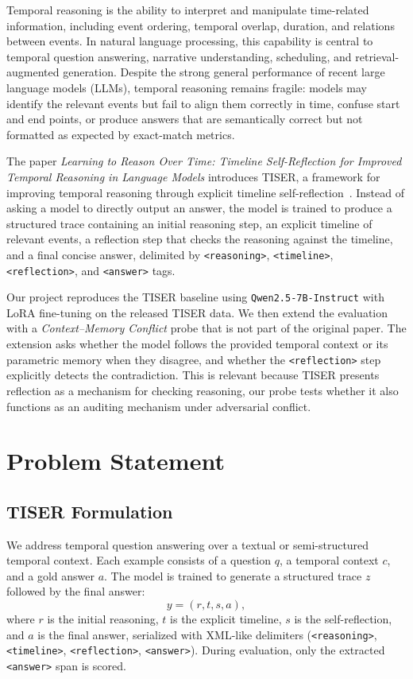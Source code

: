 \documentclass[conference]{IEEEtran}
\begin{document}
Temporal reasoning is the ability to interpret and manipulate time-related information, including event ordering, temporal overlap, duration, and relations between events. In natural language processing, this capability is central to temporal question answering, narrative understanding, scheduling, and retrieval-augmented generation. Despite the strong general performance of recent large language models (LLMs), temporal reasoning remains fragile: models may identify the relevant events but fail to align them correctly in time, confuse start and end points, or produce answers that are semantically correct but not formatted as expected by exact-match metrics.

The paper \emph{Learning to Reason Over Time: Timeline Self-Reflection for Improved Temporal Reasoning in Language Models} introduces TISER, a framework for improving temporal reasoning through explicit timeline self-reflection~\cite{bazaga2025tiser}. Instead of asking a model to directly output an answer, the model is trained to produce a structured trace containing an initial reasoning step, an explicit timeline of relevant events, a reflection step that checks the reasoning against the timeline, and a final concise answer, delimited by \texttt{<reasoning>}, \texttt{<timeline>}, \texttt{<reflection>}, and \texttt{<answer>} tags.

Our project reproduces the TISER baseline using \texttt{Qwen2.5-7B-Instruct} with LoRA fine-tuning on the released TISER data. We then extend the evaluation with a \emph{Context--Memory Conflict} probe that is not part of the original paper. The extension asks whether the model follows the provided temporal context or its parametric memory when they disagree, and whether the \texttt{<reflection>} step explicitly detects the contradiction. This is relevant because TISER presents reflection as a mechanism for checking reasoning, our probe tests whether it also functions as an auditing mechanism under adversarial conflict.

\section{Problem Statement}

\subsection{TISER Formulation}

We address temporal question answering over a textual or semi-structured temporal context. Each example consists of a question $q$, a temporal context $c$, and a gold answer $a$. The model is trained to generate a structured trace $z$ followed by the final answer:
\[
y = (r, t, s, a),
\]
where $r$ is the initial reasoning, $t$ is the explicit timeline, $s$ is the self-reflection, and $a$ is the final answer, serialized with XML-like delimiters (\texttt{<reasoning>}, \texttt{<timeline>}, \texttt{<reflection>}, \texttt{<answer>}). During evaluation, only the extracted \texttt{<answer>} span is scored.
\end{document}
